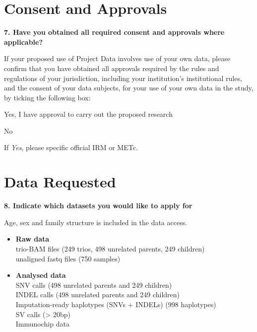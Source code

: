 \documentclass[a4paper,12pt]{article}
\begin{document}
\begin{Form}
\TextField[name=studyDescription,multiline=true,height=30\baselineskip]{}

\section*{Consent and Approvals}

\textbf{7. Have you obtained all required consent and approvals where applicable?}

If your proposed use of Project Data involves use of your own data, please confirm that you have obtained all approvals required by the rules and regulations of your jurisdiction, including your institution’s institutional rules, and the consent of your data subjects, for your use of your own data in the study, by ticking the following box:

 Yes, I have approval to carry out the proposed research

 No

If \emph{Yes}, please specific official IRM or METc.

\TextField[name=consentApproval,multiline=true,height=6\baselineskip]{}

\section*{Data Requested}

\textbf{8. Indicate which datasets you would like to apply for}

Age, sex and family structure is included in the data access.
\begin{itemize}
  \item[] \CheckBox[name=testYes]{\ignorespaces} \textbf{Raw data} \\
    \-\hspace{7mm}trio-BAM files (249 trios, 498 unrelated parents, 249 children) \\
    \-\hspace{7mm}unaligned fastq files (750 samples) \\
  \item[] \CheckBox[name=testNo]{\ignorespaces} \textbf{Analysed data} \\
    \-\hspace{7mm}SNV calls (498 unrelated parents and 249 children) \\
    \-\hspace{7mm}INDEL calls (498 unrelated parents and 249 children) \\
    \-\hspace{7mm}Imputation-ready haplotypes (SNVs + INDELs) (998 haplotypes) \\
    \-\hspace{7mm}SV calls (> 20bp) \\
    \-\hspace{7mm}Immunochip data \\
\end{itemize}


\end{Form}
\end{document}

